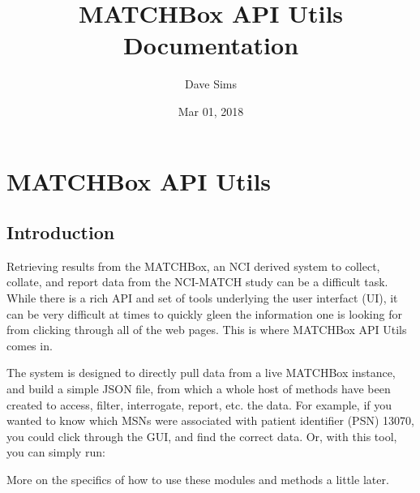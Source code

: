 \documentclass[letterpaper,10pt,english]{sphinxmanual}
\title{MATCHBox API Utils Documentation}
\date{Mar 01, 2018}
\author{Dave Sims}
\begin{document}
\maketitle
\sphinxtableofcontents
{}\label{\detokenize{index::doc}}



\chapter{MATCHBox API Utils}
\label{\detokenize{intro::doc}}\label{\detokenize{intro:welcome-to-matchbox-api-utils-documentation}}\label{\detokenize{intro:matchbox-api-utils}}

\section{Introduction}
\label{\detokenize{intro:introduction}}
Retrieving results from the MATCHBox, an NCI derived system to collect, collate,
and report data from the NCI-MATCH study can be a difficult task.  While there is
a rich API and set of tools underlying the user interfact (UI), it can be very
difficult at times to quickly gleen the information one is looking for from clicking
through all of the web pages.  This is where MATCHBox API Utils comes in.

The system is designed to directly pull data from a live MATCHBox instance, and
build a simple JSON file, from which a whole host of methods have been created
to access, filter, interrogate, report, etc. the data.  For example, if you wanted
to know which MSNs were associated with patient identifier (PSN) 13070, you could
click through the GUI, and find the correct data.  Or, with this tool, you can
simply run:

%
\begin{sphinxVerbatim}[commandchars=\\\{\}]
   
  
\end{sphinxVerbatim}

More on the specifics of how to use these modules and methods a little later.
\end{document}
